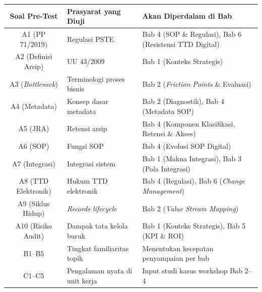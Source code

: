 \documentclass[12pt,a4paper]{report}
\begin{document}
\renewcommand{\arraystretch}{1.3}
\begin{center}
\small
\begin{tabularx}{0.95\textwidth}{@{} c X X @{}}
\toprule
\textbf{Soal Pre-Test} & \textbf{Prasyarat yang Diuji} & \textbf{Akan Diperdalam di Bab} \\
\midrule
A1 (PP 71/2019) & Regulasi PSTE & Bab 4 (SOP \& Regulasi), Bab 6 (Resistensi TTD Digital) \\
A2 (Definisi Arsip) & UU 43/2009 & Bab 1 (Konteks Strategis) \\
A3 (\textit{Bottleneck}) & Terminologi proses bisnis & Bab 2 (\textit{Friction Points} \& Evaluasi) \\
A4 (Metadata) & Konsep dasar metadata & Bab 2 (Diagnostik), Bab 4 (Metadata SOP) \\
A5 (JRA) & Retensi arsip & Bab 4 (Komponen Klasifikasi, Retensi \& Akses) \\
A6 (SOP) & Fungsi SOP & Bab 4 (Evolusi SOP Digital) \\
A7 (Integrasi) & Integrasi sistem & Bab 1 (Makna Integrasi), Bab 3 (Pola Integrasi) \\
A8 (TTD Elektronik) & Hukum TTD elektronik & Bab 4 (Regulasi), Bab 6 (\textit{Change Management}) \\
A9 (Siklus Hidup) & \textit{Records lifecycle} & Bab 2 (\textit{Value Stream Mapping}) \\
A10 (Risiko Audit) & Dampak tata kelola buruk & Bab 1 (Konteks Strategis), Bab 5 (KPI \& ROI) \\
\midrule
B1--B5 & Tingkat familiaritas topik & Menentukan kecepatan penyampaian per bab \\
\midrule
C1--C5 & Pengalaman nyata di unit kerja & Input studi kasus workshop Bab 2--4 \\
\bottomrule
\end{tabularx}
\end{center}
\renewcommand{\arraystretch}{1.0}
\end{document}
